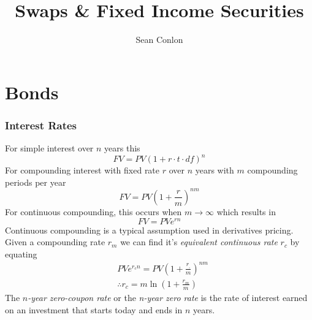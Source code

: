 \documentclass{article}
\title{Swaps \& Fixed Income Securities}
\author{Sean Conlon}
\begin{document}
\maketitle

\newpage
\section{Bonds}


\subsubsection*{Interest Rates}
For simple interest over $n$ years this 
$$FV = PV(1+r\cdot t\cdot df)^n$$
For compounding interest with fixed rate $r$ over $n$ years with $m$ compounding periods per year
$$FV = PV\left(1+\frac{r}{m}\right)^{nm}$$
For continuous compounding, this occurs when $m\rightarrow\infty$ which results in 
$$FV = PVe^{rn}$$
Continuous compounding is a typical assumption used in derivatives pricing. Given a compounding rate $r_m$ we can find it's \textit{equivalent continuous rate} $r_c$ by equating 
\begin{align*}
    & PVe^{r_cn} = PV\left(1+\frac{r_,}{m}\right)^{nm} \\
    & \therefore r_c = m \ln\left(1+\frac{r_m}{m} \right)
\end{align*}
The $n$\textit{-year zero-coupon rate} or the \textit{n-year zero rate} is the rate of interest earned on an investment that starts today and ends in $n$ years.
\end{document}
